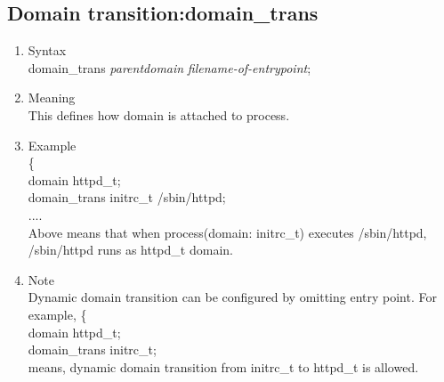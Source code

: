 \documentclass{article}
\begin{document}
\subsection{Domain transition:domain\_trans}
\begin{enumerate}
 \item Syntax\\
    domain\_trans {\it parentdomain} {\it filename-of-entrypoint};
 \item Meaning\\
    This defines how domain is attached to process. 
 \item Example\\
   \{\\
   domain httpd\_t;\\
   domain\_trans initrc\_t /sbin/httpd;\\
   ....\\
   Above means that when process(domain: initrc\_t) executes
       /sbin/httpd, /sbin/httpd runs as httpd\_t domain.
 \item Note\\
       Dynamic domain transition can be configured by omitting entry
       point. For example,  
       \{\\
       domain httpd\_t;\\
       domain\_trans  initrc\_t;\\
       
       means, dynamic domain transition from initrc\_t to httpd\_t is allowed.

\end{enumerate}
\end{document}
